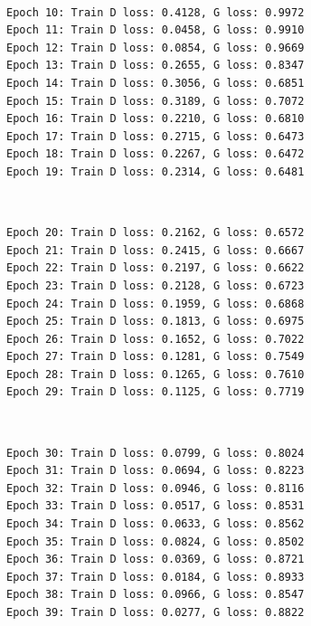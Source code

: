 \documentclass[11pt]{article}
\begin{document}
    \begin{center}
    \end{center}
    { \hspace*{\fill} \\}
    
    \begin{Verbatim}[commandchars=\\\{\}]
Epoch 10: Train D loss: 0.4128, G loss: 0.9972
Epoch 11: Train D loss: 0.0458, G loss: 0.9910
Epoch 12: Train D loss: 0.0854, G loss: 0.9669
Epoch 13: Train D loss: 0.2655, G loss: 0.8347
Epoch 14: Train D loss: 0.3056, G loss: 0.6851
Epoch 15: Train D loss: 0.3189, G loss: 0.7072
Epoch 16: Train D loss: 0.2210, G loss: 0.6810
Epoch 17: Train D loss: 0.2715, G loss: 0.6473
Epoch 18: Train D loss: 0.2267, G loss: 0.6472
Epoch 19: Train D loss: 0.2314, G loss: 0.6481

    \end{Verbatim}

    \begin{center}
    \end{center}
    { \hspace*{\fill} \\}
    
    \begin{Verbatim}[commandchars=\\\{\}]
Epoch 20: Train D loss: 0.2162, G loss: 0.6572
Epoch 21: Train D loss: 0.2415, G loss: 0.6667
Epoch 22: Train D loss: 0.2197, G loss: 0.6622
Epoch 23: Train D loss: 0.2128, G loss: 0.6723
Epoch 24: Train D loss: 0.1959, G loss: 0.6868
Epoch 25: Train D loss: 0.1813, G loss: 0.6975
Epoch 26: Train D loss: 0.1652, G loss: 0.7022
Epoch 27: Train D loss: 0.1281, G loss: 0.7549
Epoch 28: Train D loss: 0.1265, G loss: 0.7610
Epoch 29: Train D loss: 0.1125, G loss: 0.7719

    \end{Verbatim}

    \begin{center}
    \end{center}
    { \hspace*{\fill} \\}
    
    \begin{Verbatim}[commandchars=\\\{\}]
Epoch 30: Train D loss: 0.0799, G loss: 0.8024
Epoch 31: Train D loss: 0.0694, G loss: 0.8223
Epoch 32: Train D loss: 0.0946, G loss: 0.8116
Epoch 33: Train D loss: 0.0517, G loss: 0.8531
Epoch 34: Train D loss: 0.0633, G loss: 0.8562
Epoch 35: Train D loss: 0.0824, G loss: 0.8502
Epoch 36: Train D loss: 0.0369, G loss: 0.8721
Epoch 37: Train D loss: 0.0184, G loss: 0.8933
Epoch 38: Train D loss: 0.0966, G loss: 0.8547
Epoch 39: Train D loss: 0.0277, G loss: 0.8822

    \end{Verbatim}
\end{document}
